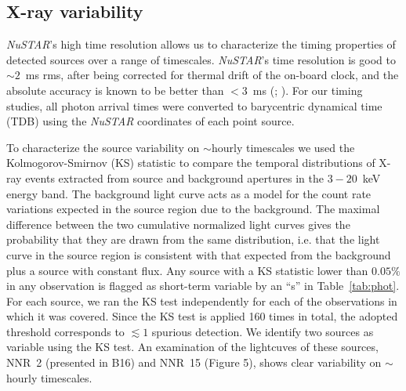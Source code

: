 \documentclass[iop,revtex4]{emulateapj}
\begin{document}
\subsection{X-ray variability}
\label{sec:var}
\textit{NuSTAR}'s high time resolution allows us to characterize the timing properties of detected sources over a range of timescales. \textit{NuSTAR}'s time resolution is good to $\sim 2$~ms rms, after being corrected for thermal drift of the on-board clock, and the
absolute accuracy is known to be better than $< 3$~ms (\citealt{mori14}; \citealt{madsen15}). 
For our timing studies, all photon arrival times were converted to barycentric dynamical time (TDB) using the \textit{NuSTAR} coordinates of each point source. \par
To characterize the source variability on $\sim\mathrm{hourly}$ timescales we
used the Kolmogorov-Smirnov (KS) statistic to compare the temporal
distributions of X-ray events extracted from source and background
apertures in the $3-20$~keV energy band.  The background light curve acts
as a model for the count rate variations expected in the source region due to the background. The
maximal difference between the two cumulative normalized light curves gives
the probability that they are drawn from the same distribution, i.e. that the light curve in the source region is consistent with that expected from the background plus a source with constant flux.  Any source with a KS statistic
lower than $0.05\%$ in any observation is flagged as short-term variable by an ``s'' in Table~\ref{tab:phot}.  For each source, we ran the KS test independently for each of the observations in which it was covered.
 Since the KS test is applied 160 times in total, the adopted threshold corresponds to $\lesssim1$ spurious detection.  We identify two sources as variable using the KS test.  An examination of the lightcuves of these sources, NNR~2 (presented in B16) and NNR~15 (Figure 5), shows clear variability on $\sim$hourly timescales.\par
\end{document}
